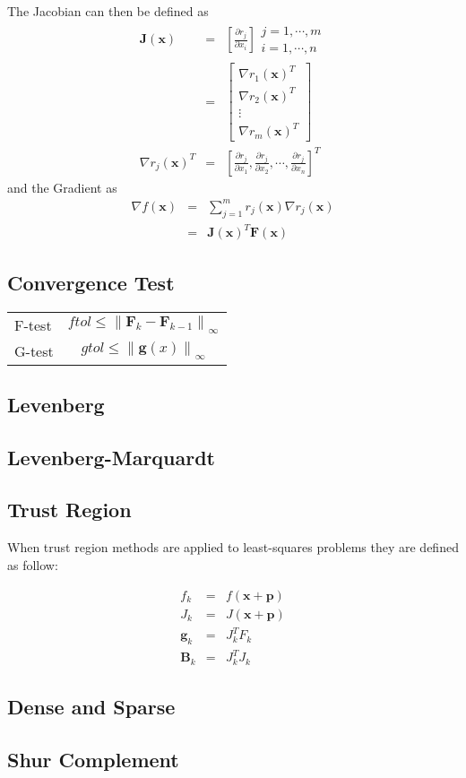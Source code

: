 \documentclass[peerreview,onecolumn]{IEEEtran}
\newcommand{\norm}[1]{\left\lVert#1\right\rVert}
\begin{document}
The Jacobian can then be defined as
\begin{eqnarray}
\bm{J}(\bm{x}) &=& \left[\frac{\partial r_j}{\partial x_i}\right]\begin{array}{l}j=1,\cdots,m\\i=1,\cdots,n \end{array} \\
&=& \left[ \begin{array}{c}\nabla r_1(\bm{x})^T \\ \nabla r_2(\bm{x})^T \\ \vdots \\ \nabla r_m(\bm{x})^T \end{array}\right] \\
\nabla r_j(\bm{x})^T &=& \left[ \frac{\partial r_j}{\partial x_1},\frac{\partial r_j}{\partial x_2}, \cdots , \frac{\partial r_j}{\partial x_n} \right]^T
\end{eqnarray}
and the Gradient as
\begin{eqnarray}
\nabla f(\bm{x}) &=& \sum^m_{j=1}r_j(\bm{x})\nabla r_j(\bm{x}) \\
&=& \bm{J}(\bm{x})^T \bm{F}(\bm{x})
\end{eqnarray}

\subsection{Convergence Test}
\begin{center}
\begin{tabular}{lc}
F-test & $ftol \leq \norm{\bm{F}_k-\bm{F}_{k-1}}_\infty$ \\
G-test & $gtol \leq \norm{\bm{g}(x)}_\infty$ \\
\end{tabular}
\end{center}

\subsection{Levenberg}


\subsection{Levenberg-Marquardt}

\subsection{Trust Region}

When trust region methods are applied to least-squares problems they are defined as follow:

\begin{eqnarray}
f_k &=& f(\bm{x}+\bm{p}) \\
J_k &=& J(\bm{x}+\bm{p}) \\
\bm{g}_k &=& J^T_k F_k  \\
\bm{B}_k &=& J_k^T J_k
\end{eqnarray}


\subsection{Dense and Sparse}

\subsection{Shur Complement}



\end{document}
